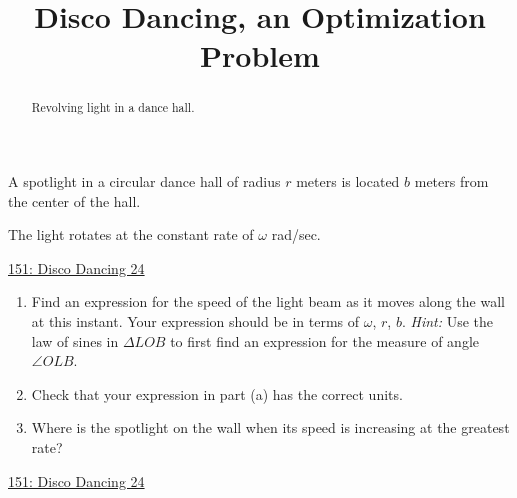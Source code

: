 \documentclass{ximera}
\title{Disco Dancing, an Optimization Problem}
\begin{document}
\begin{abstract}
Revolving light in a dance hall.
\end{abstract}
\maketitle

\begin{question}  \label{QdsadfKGDCCCC}
A spotlight in a circular dance hall of radius $r$ meters is located $b$ meters from the center of the hall. 

The light rotates at the constant rate of $\omega$ rad/sec. 

\begin{onlineOnly}
   \begin{center}
\end{center}
\end{onlineOnly}

\href{https://www.desmos.com/calculator/dve2veveuw}{151: Disco Dancing 24}


\begin{enumerate}
\item Find an expression for the speed of the light beam as it moves along the wall at this instant. Your expression should be in terms of $\omega$, $r$, $b$. \emph{Hint:} Use the law of sines in $\Delta LOB$ to first find an expression for the measure of angle $\angle OLB$.

\item Check that your expression in  part (a) has the correct units.

\item Where is the spotlight on the wall when its speed is increasing at the greatest rate?

\end{enumerate}

\end{question}

\begin{onlineOnly}
   \begin{center}
\end{center}
\end{onlineOnly}

\href{https://www.desmos.com/calculator/sp93wegrcb}{151: Disco Dancing 24}
\end{document}
